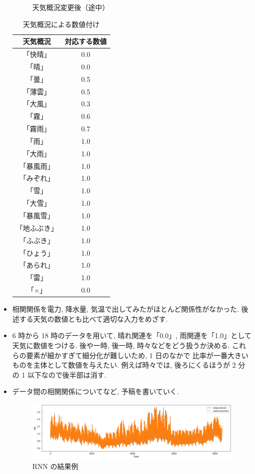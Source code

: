 \begin{itemize}
\begin{figure}[phb]
\caption{天気概況変更後（途中）}
\end{figure}
\begin{table}[t]
\centering
  \caption{天気概況による数値付け}
  \begin{tabular}{|c|c|} \hline
    天気概況 & 対応する数値 \\ \hline
    「快晴」 & 0.0 \\ \hline
    「晴」 & 0.0 \\ \hline
    「曇」 & 0.5 \\ \hline
    「薄雲」 & 0.5 \\ \hline
    「大風」 & 0.3 \\ \hline
    「霧」 & 0.6 \\ \hline
    「霧雨」 & 0.7 \\ \hline
    「雨」 & 1.0 \\ \hline
    「大雨」 & 1.0 \\ \hline
    「暴風雨」 & 1.0 \\ \hline
    「みぞれ」 & 1.0 \\ \hline
    「雪」 & 1.0 \\ \hline
    「大雪」 & 1.0 \\ \hline
    「暴風雪」 & 1.0 \\ \hline
    「地ふぶき」 & 1.0 \\ \hline
    「ふぶき」 & 1.0 \\ \hline
    「ひょう」 & 1.0 \\ \hline
    「あられ」 & 1.0 \\ \hline
    「雷」 & 1.0 \\ \hline
    「×」 & 0.0 \\ \hline
  \end{tabular}
\end{table}
        \item 相関関係を電力, 降水量, 気温で出してみたがほとんど関係性がなかった. 後述する天気の数値とも比べて適切な入力をめざす.
        \item 6 時から 18 時のデータを用いて, 晴れ関連を「0.0」, 雨関連を「1.0」として天気に数値をつける. 後や一時, 後一時, 時々などをどう扱うか決める. これらの要素が細かすぎて細分化が難しいため, 1 日のなかで 比率が一番大きいものを主体として数値を与えたい. 例えば時々では, 後ろにくるほうが 2 分の 1 以下なので後半部は消す.
        \item データ間の相関関係についてなど, 予稿を書いていく. 

\begin{figure}[phb]
\centering
\includegraphics[scale=0.5]{kekka.png}
\caption{RNN の結果例}
\end{figure}
\end{itemize}

